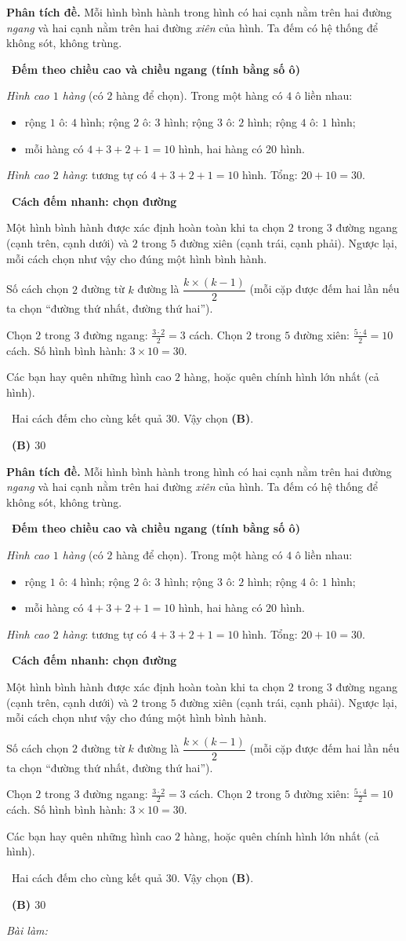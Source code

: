 \documentclass[11pt]{article}
\newif\ifsol \soltrue
\providecommand{\AnsWord}{Đáp số}
\newcommand{\StuProb}[2]{\begin{probboxS}{#1}{#2}\StuProbBody\end{probboxS}}
\newcommand{\ans}[1]{\par\smallskip{\bfseries\color{tmGreen!88!black}\AnsWord:}\ {\bfseries\color{AnsRed}#1}\par}
\newcommand{\probsol}[1]{%
  \begin{lrbox}{\solmeasure}\begin{minipage}{\dimexpr\linewidth-24pt\relax}#1\end{minipage}\end{lrbox}%
  \ifsol
    \begin{solbox}#1\end{solbox}%
  \else
    \setlength{\solht}{\dimexpr\ht\solmeasure+\dp\solmeasure+0.85cm\relax}%
    \ifdim\solht<1.35cm\setlength{\solht}{1.35cm}\fi
    \ifdim\solht>\StudentMaxWork\setlength{\solht}{\StudentMaxWork}\fi
    \par\noindent\begin{minipage}{\linewidth}%
    \expandafter\StuProb\StuProbArgs
    \begin{tcolorbox}[colback=white,colframe=Line,boxrule=0.8pt,arc=5pt,
      left=8pt,right=8pt,top=4pt,bottom=4pt,height=\solht]{\footnotesize\color{Slate}\itshape\WorkWord}\end{tcolorbox}%
    \end{minipage}\par\medskip
  \fi}
\newlength{\StudentMaxWork}\setlength{\StudentMaxWork}{4.5cm}
\newcommand{\step}[2]{\par\smallskip\noindent{\bfseries\color{tmBlue!85!black}\StepWord~#1.}\ {\bfseries #2}\par\nopagebreak}
\newcommand{\verify}[1]{\par\smallskip\noindent{\bfseries\color{tmGreen!80!black}\faCheckCircle\ \CheckWord}\ #1\par}
\def\WorkWord{Bài làm:}
\def\AnsWord{Đáp số}
\def\StepWord{Bước}
\def\CheckWord{Thử lại:}
\begin{document}
\probsol{
\textbf{Phân tích đề.} Mỗi hình bình hành trong hình có hai cạnh nằm trên hai đường \emph{ngang} và hai cạnh
nằm trên hai đường \emph{xiên} của hình. Ta đếm có hệ thống để không sót, không trùng.

\step{1}{Đếm theo chiều cao và chiều ngang (tính bằng số ô)}
\emph{Hình cao $1$ hàng} (có $2$ hàng để chọn). Trong một hàng có $4$ ô liền nhau:
\begin{itemize}[leftmargin=1.4em,itemsep=1pt]
\item rộng $1$ ô: $4$ hình; rộng $2$ ô: $3$ hình; rộng $3$ ô: $2$ hình; rộng $4$ ô: $1$ hình;
\item mỗi hàng có $4+3+2+1=10$ hình, hai hàng có $20$ hình.
\end{itemize}
\emph{Hình cao $2$ hàng}: tương tự có $4+3+2+1=10$ hình. Tổng: $20+10=30$.

\step{2}{Cách đếm nhanh: chọn đường}
\begin{proofbox}Một hình bình hành được xác định hoàn toàn khi ta chọn $2$ trong $3$ đường ngang (cạnh trên,
cạnh dưới) và $2$ trong $5$ đường xiên (cạnh trái, cạnh phải). Ngược lại, mỗi cách chọn như vậy cho đúng một
hình bình hành.\end{proofbox}
\begin{recallbox}Số cách chọn $2$ đường từ $k$ đường là $\dfrac{k\times(k-1)}{2}$ (mỗi cặp được đếm hai lần
nếu ta chọn ``đường thứ nhất, đường thứ hai'').\end{recallbox}
Chọn $2$ trong $3$ đường ngang: $\tfrac{3\cdot 2}{2}=3$ cách. Chọn $2$ trong $5$ đường xiên:
$\tfrac{5\cdot4}{2}=10$ cách. Số hình bình hành: $3\times 10=30$.

\begin{warnbox}Các bạn hay quên những hình cao $2$ hàng, hoặc quên chính hình lớn nhất (cả hình).\end{warnbox}
\verify{Hai cách đếm cho cùng kết quả $30$. Vậy chọn \textbf{(B)}.}
\ans{(B) $30$}
}
\end{document}
